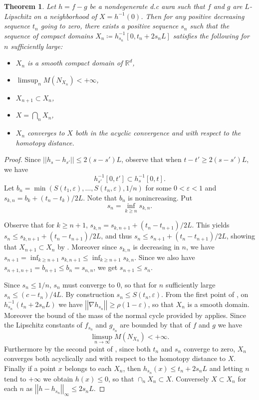 \documentclass[10pt,a4paper]{amsart}
\newtheorem{theorem}{Theorem}
\newcommand{\R}{\mathbb{R}}
\newcommand{\eps}{\varepsilon}
\newcommand{\norme}[1]{\left\lvert \left \lvert #1 \right \rvert \right \rvert}
\begin{document}
\begin{theorem}
Let $h = f - g$ be a nondegenerate d.c aura such that $f$ and $g$ are $L$-Lipschitz on a neighborhood of $X = h^{-1}(0)$. Then for any positive decreasing sequence $t_n$ going to zero, there exists a positive sequence $s_n$ such that the sequence of compact domains $X_n \coloneqq h_{s_n}^{-1}[0, t_n + 2s_nL]$ satisfies the following for $n$ sufficiently large:
\begin{itemize}
\item $X_n$ is a smooth compact domain of $\R^d$,
\item $\limsup_n M(N_{X_n}) < + \infty$,
\item $X_{n+1} \subset X_n$,
\item $X = \bigcap_{n} X_n$,
\item $X_n$ converges to $X$ both in the acyclic convergence and with respect to the homotopy distance.
\end{itemize}

\end{theorem}

\begin{proof}

 Since $\norme{h_s - h_{s'}} \leq 2(s - s')L$, observe that when $t - t' \geq 2(s -s')L$, we have 
\begin{equation}
\label{eq:inclusion}
    h_{s'}^{-1}[0, t'] \subset h_s^{-1}[0,t]. 
\end{equation} 
Let $b_n = \min(S(t_1, \eps), \dots, S(t_n, \eps), 1/n)$ for some $0 < \eps < 1$ and $s_{k,n} = b_k + (t_n - t_k)/2L$. Note that $b_n$ is nonincreasing.
Put
\[ s_n = \inf_{k \geq n} s_{k,n}. \]

Observe that for $k \geq n+1$,  $s_{k,n} = s_{k,n+1} + (t_{n} - t_{n+1})/2L$. This yields $s_n \leq s_{k,n+1} + (t_n - t_{n+1})/2L$, and thus $s_n \leq s_{n+1} + (t_n - t_{n+1})/2L$, showing that $X_{n+1} \subset X_n$ by .
Moreover since $s_{k,n}$ is decreasing in $n$, we have $s_{n+1} = \inf_{k \geq n+1} s_{k,n+1} \leq \inf_{k \geq n+1} s_{k,n}$. Since we also have $s_{n+1, n+1} = b_{n+1} \leq b_n = s_{n,n}$, we get $s_{n+1}\leq s_{n}$.

 Since $s_n \leq 1/n$, $s_n$ must converge to 0, so that for $n$ sufficiently large $s_n \leq (c - t_n)/4L$. By construction $s_n \leq S(t_n, \eps)$. From the first point of , on $h_{s_n}^{-1}(t_n + 2s_nL)$ we have $\norme{\nabla h_{s_n}} \geq \rho(1 - \eps)$, so that $X_n$ is a smooth domain. Moreover the bound of the mass of the normal cycle provided by  applies. Since the Lipschitz constants of $f_{s_n}$ and $g_{s_n}$ are bounded by that of $f$ and $g$ we have
 \[ \limsup_{n \to \infty} M(N_{X_n}) < + \infty.\]
Furthermore by the second point of , since both $t_n$ and $s_n$ converge to zero, $X_n$ converges both acyclically and with respect to the homotopy distance to $X$. 
Finally if a point $x$ belongs to each $X_n$, then $h_{s_n}(x) \leq t_n + 2s_nL$ and letting $n$ tend to $+\infty$ we obtain $h(x) \leq 0$, so that $\cap_n X_n \subset X$. Conversely $X \subset X_n$ for each $n$ as $\norme{h - h_{s_n}}_{\infty} \leq 2s_nL$.
\end{proof}
\end{document}
